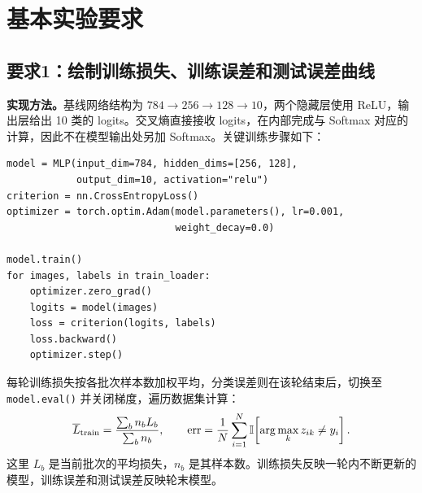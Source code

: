 \documentclass[UTF8,11pt,a4paper,fontset=fandol]{ctexart}
\newcommand{\err}{\operatorname{err}}
\newcommand{\question}[1]{\Needspace{14\baselineskip}\subsection{#1}}
\begin{document}
\clearpage
\section{基本实验要求}
\question{要求1：绘制训练损失、训练误差和测试误差曲线}
\textbf{实现方法。}基线网络结构为 $784\to256\to128\to10$，两个隐藏层使用 ReLU，输出层给出 10 类的 logits。交叉熵直接接收 logits，在内部完成与 Softmax 对应的计算，因此不在模型输出处另加 Softmax。关键训练步骤如下：
\par\noindent\begin{minipage}{\linewidth}
\begin{lstlisting}
model = MLP(input_dim=784, hidden_dims=[256, 128],
            output_dim=10, activation="relu")
criterion = nn.CrossEntropyLoss()
optimizer = torch.optim.Adam(model.parameters(), lr=0.001,
                             weight_decay=0.0)

model.train()
for images, labels in train_loader:
    optimizer.zero_grad()
    logits = model(images)
    loss = criterion(logits, labels)
    loss.backward()
    optimizer.step()
\end{lstlisting}
\end{minipage}\par
每轮训练损失按各批次样本数加权平均，分类误差则在该轮结束后，切换至 \texttt{model.eval()} 并关闭梯度，遍历数据集计算：
\begin{equation}
\overline{L}_{\rm train}=\frac{\sum_b n_b L_b}{\sum_b n_b},\qquad
\err=\frac{1}{N}\sum_{i=1}^{N}\mathbb{I}\!\left[\arg\max_k z_{ik}\ne y_i\right].
\end{equation}
这里 $L_b$ 是当前批次的平均损失，$n_b$ 是其样本数。训练损失反映一轮内不断更新的模型，训练误差和测试误差反映轮末模型。
\end{document}
